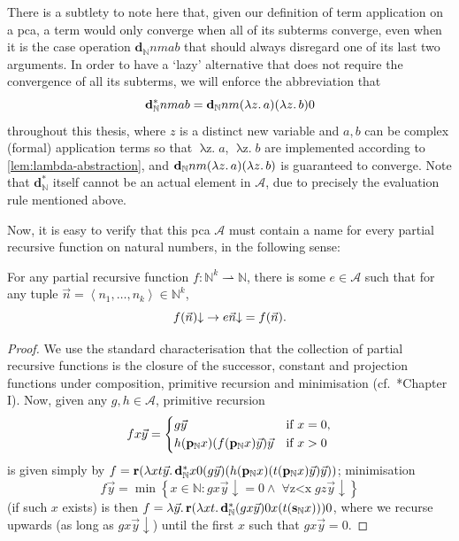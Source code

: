 \documentclass[12pt,openany]{book}
\theoremstyle{plain}
\theoremstyle{definition}
\newcommand\tuple[1]{\left\langle #1 \right\rangle}
\newcommand\opA[1]{\mathop{\forall #1}}
\newcommand\oplam[1]{\mathop{\lambda #1.}}
\newcommand\br{\mathbf{r}}
\newcommand\bsN{\mathbf{s}_\mathbb{N}}
\newcommand\bpN{\mathbf{p}_\mathbb{N}}
\newcommand\bdN{\mathbf{d}_\mathbb{N}}
\begin{document}
There is a subtlety to note here that, given our definition of term application on a pca, a term would only converge when all of its subterms converge, even when it is the case operation $\bdN nmab$ that should always disregard one of its last two arguments. In order to have a `lazy' alternative that does not require the convergence of all its subterms, we will enforce the abbreviation that
\[\bdN^* nmab = \bdN nm \mleft(\oplam{z} a\mright) \mleft(\oplam{z} b\mright) 0\]
throughout this thesis, where $z$ is a distinct new variable and $a, b$ can be complex (formal) application terms so that $\oplam{z} a$, $\oplam{z} b$ are implemented according to \autoref{lem:lambda-abstraction}, and $\bdN nm \mleft(\oplam{z} a\mright) \mleft(\oplam{z} b\mright)$ is guaranteed to converge. Note that $\bdN^*$ itself cannot be an actual element in $\mathcal{A}$, due to precisely the evaluation rule mentioned above.

Now, it is easy to verify that this pca $\mathcal{A}$ must contain a name for every partial recursive function on natural numbers, in the following sense:

\begin{lemma}
  \label{lem:rec-in-pca}
  For any partial recursive function $f : \mathbb{N}^k \rightharpoonup \mathbb{N}$, there is some $e \in \mathcal{A}$ such that for any tuple $\vec{n} = \tuple{n_1, \ldots, n_k} \in \mathbb{N}^k$,
  \[f\mleft(\vec{n}\mright) {\downarrow} \rightarrow e \vec{n} {\downarrow} = f\mleft(\vec{n}\mright).\]
\end{lemma}

\begin{proof}
  We use the standard characterisation that the collection of partial recursive functions is the closure of the successor, constant and projection functions under composition, primitive recursion and minimisation (cf.\ \cite{soare87-re-book}*{Chapter I}). Now, given any $g, h \in \mathcal{A}$, primitive recursion
  \[fx\vec{y} = \left\{\begin{aligned}
       & g\vec{y}                                                                       &  & \text{if $x = 0$}, \\
       & h \mleft(\bpN x\mright) \mleft(f \mleft(\bpN x\mright) \vec{y}\mright) \vec{y} &  & \text{if $x > 0$}
    \end{aligned}\right.\]
  is given simply by $f = \br \mleft(\oplam{xt \vec{y}} \bdN^* x0 \mleft(g \vec{y}\mright) \mleft(h \mleft(\bpN x\mright) \mleft(t \mleft(\bpN x\mright) \vec{y}\mright) \vec{y}\mright)\mright)$; minimisation
  \[f\vec{y} = \min \left\{x \in \mathbb{N} : gx\vec{y} {\downarrow} = 0 \land \opA{z < x} gz\vec{y} {\downarrow}\right\}\]
  (if such $x$ exists) is then $f = \oplam{\vec{y}} \br \mleft(\oplam{xt} \bdN^* \mleft(gx \vec{y}\mright) 0 x \mleft(t \mleft(\bsN x\mright)\mright)\mright) 0$, where we recurse upwards (as long as $gx\vec{y} {\downarrow}$) until the first $x$ such that $gx\vec{y} = 0$.
\end{proof}
\end{document}
